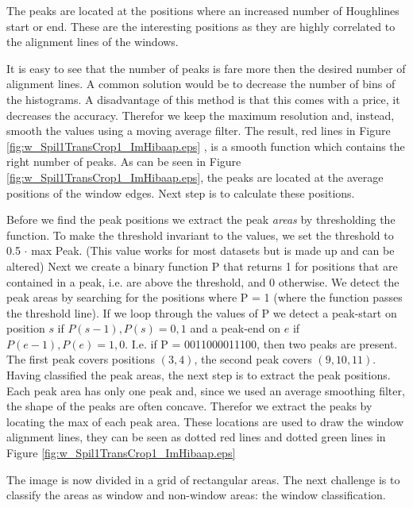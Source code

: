 The peaks are located at the positions where an increased number of Houghlines
start or end.  These are the interesting positions as they are highly correlated
to the alignment lines of the windows. 

It is easy to see that the number of peaks is fare more then the desired number of alignment lines.
A common solution would be to decrease the number of bins of the histograms. A
disadvantage of this method is that this comes with a price, it decreases the accuracy. Therefor
we keep the maximum resolution and, instead, smooth the values using a moving average filter.
The result, red lines in Figure \ref{fig:w_Spil1TransCrop1_ImHibaap.eps}
, is a smooth function which contains the right number of peaks. As can be seen
in Figure \ref{fig:w_Spil1TransCrop1_ImHibaap.eps}, the peaks
are located at the average positions of the window edges. Next step is to
calculate these positions. 

Before we find the peak positions we extract the peak \emph{areas} by thresholding the
function. To make the threshold invariant to the values, we set the threshold to 0.5 $\cdot$ max Peak. 
(This value works for most datasets but is made up and can be altered)
Next we create a binary function P that returns 1 for positions that are contained in
a peak, i.e. are above the threshold, and 0 otherwise.
We detect the peak areas by searching for the positions where P = 1
(where the function passes the threshold line). 
If we loop through the values of P we detect a peak-start on position $s$ if ${P(s-1),P(s)}={0,1}$
and a peak-end on $e$ if ${P(e-1),P(e)}={1,0}$. 
I.e. if P = 0011000011100, then two peaks are present. The first peak covers positions $(3,4)$, 
the second peak covers $(9,10,11)$.\\

Having classified the peak areas, the next step is to extract the peak positions. 
Each peak area has only one peak and, since we used an average smoothing filter, the shape of 
the peaks are often concave. Therefor we extract the peaks by locating the max of each peak area. 
These locations are used to draw the window alignment lines, they can be seen
as dotted red lines and dotted green lines in Figure \ref{fig:w_Spil1TransCrop1_ImHibaap.eps}

The image is now divided in a grid of rectangular areas. The next challenge is to 
classify the areas as window and non-window areas: the window classification.

